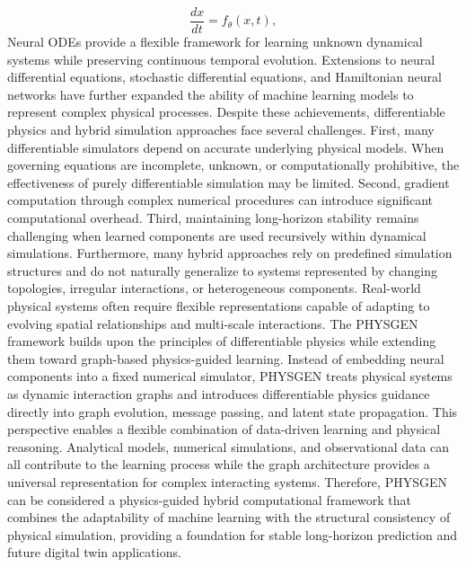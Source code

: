 \begin{equation} \frac{dx}{dt}=f_\theta(x,t), \end{equation} Neural ODEs provide a flexible framework for learning unknown dynamical systems while preserving continuous temporal evolution. Extensions to neural differential equations, stochastic differential equations, and Hamiltonian neural networks have further expanded the ability of machine learning models to represent complex physical processes. Despite these achievements, differentiable physics and hybrid simulation approaches face several challenges. First, many differentiable simulators depend on accurate underlying physical models. When governing equations are incomplete, unknown, or computationally prohibitive, the effectiveness of purely differentiable simulation may be limited. Second, gradient computation through complex numerical procedures can introduce significant computational overhead. Third, maintaining long-horizon stability remains challenging when learned components are used recursively within dynamical simulations. Furthermore, many hybrid approaches rely on predefined simulation structures and do not naturally generalize to systems represented by changing topologies, irregular interactions, or heterogeneous components. Real-world physical systems often require flexible representations capable of adapting to evolving spatial relationships and multi-scale interactions. The PHYSGEN framework builds upon the principles of differentiable physics while extending them toward graph-based physics-guided learning. Instead of embedding neural components into a fixed numerical simulator, PHYSGEN treats physical systems as dynamic interaction graphs and introduces differentiable physics guidance directly into graph evolution, message passing, and latent state propagation. This perspective enables a flexible combination of data-driven learning and physical reasoning. Analytical models, numerical simulations, and observational data can all contribute to the learning process while the graph architecture provides a universal representation for complex interacting systems. Therefore, PHYSGEN can be considered a physics-guided hybrid computational framework that combines the adaptability of machine learning with the structural consistency of physical simulation, providing a foundation for stable long-horizon prediction and future digital twin applications. \] 